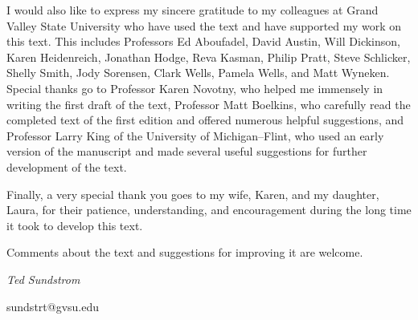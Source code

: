 %
\vskip9pt
I would also like to express my sincere gratitude to my colleagues at Grand Valley State University who have used the text and have supported my work on this text.  This includes Professors 
Ed Aboufadel, 
David Austin, 
Will Dickinson, 
Karen Heidenreich, 
Jonathan Hodge, 
Reva Kasman, 
Philip Pratt, 
Steve Schlicker, 
Shelly Smith, 
Jody Sorensen, 
Clark Wells,  
Pamela Wells, and 
Matt Wyneken.  Special thanks go to Professor Karen Novotny, who helped me immensely in writing the first draft of the text, Professor Matt Boelkins, who carefully read the completed text of the first edition and offered numerous helpful suggestions, and Professor Larry King of the University of Michigan--Flint, who used an early version of the manuscript and made several useful suggestions for further development of the text.  

Finally, a very special thank you goes to my wife, Karen, and my daughter, Laura, for their patience, understanding, and encouragement during the long time it took to develop this text.

Comments about the text and suggestions for improving it are welcome.

\begin{flushright}
\emph{Ted Sundstrom}

sundstrt@gvsu.edu
\end{flushright}
\newpage
\thispagestyle{empty}

\endinput

